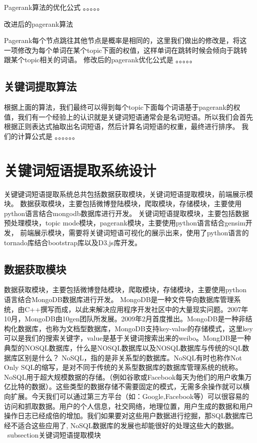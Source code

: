 \documentclass[master]{njuthesis}
\begin{document}
Pagerank算法的优化公式
。。。。。

改进后的pagerank算法

Pagerank每个节点跳往其他节点是概率是相同的，这里我们做出的修改是，将这一项修改为每个单词在某个topic下面的权值，这样单词在跳转时候会倾向于跳转跟某个topic相关的词语。
修改后的pagerank优化公式是
。。。。。

\subsection{关键词提取算法}

根据上面的算法，我们最终可以得到每个topic下面每个词语基于pagerank的权值，我们有一个经验上的认识就是关键词短语通常会是名词短语。所以我们会首先根据正则表达式抽取出名词短语，然后计算名词短语的权重，最终进行排序。
我们的计算公式是
。。。。。。

\section{关键词短语提取系统设计}

    关键键词短语提取系统总共包括数据获取模块，关键词短语提取模块，前端展示模块。
    数据获取模块，主要包括微博登陆模块，爬取模块，存储模块，主要使用python语言结合mongodb数据库进行开发。
    关键词短语提取模块，主要包括数据预处理模块，topic mode模块，pagerank模块，主要使用python语言结合gensim开发，
    前端展示模块，需要将关键词短语可视化的展示出来，使用了python语言的tornado库结合bootstrap库以及D3.js库开发。
    

\subsection{数据获取模块}
   
    数据获取模块，主要包括微博登陆模块，爬取模块，存储模块，主要使用python语言结合MongoDB数据库进行开发。
    MongoDB是一种文件导向数据库管理系统，由C++撰写而成，以此来解决应用程序开发社区中的大量现实问题。2007年10月，MongoDB由10gen团队所发展。2009年2月首度推出。MongoDB是一种非结构化数据库，也称为文档型数据库，MongoDB支持key-value的存储模式，这里key可以是我们的搜索关键字，value是基于关键词搜索出来的weibo。MongDB是一种典型的NOSQL数据库，什么是NOSQL数据库以及NOSQL数据库与传统的SQL数据库区别是什么？
    NoSQL，指的是非关系型的数据库。NoSQL有时也称作Not Only SQL的缩写，是对不同于传统的关系型数据库的数据库管理系统的统称。NoSQL用于超大规模数据的存储。（例如谷歌或Facebook每天为他们的用户收集万亿比特的数据）。这些类型的数据存储不需要固定的模式，无需多余操作就可以横向扩展。今天我们可以通过第三方平台（如：Google,Facebook等）可以很容易的访问和抓取数据。用户的个人信息，社交网络，地理位置，用户生成的数据和用户操作日志已经成倍的增加。我们如果要对这些用户数据进行挖掘，那SQL数据库已经不适合这些应用了, NoSQL数据库的发展也却能很好的处理这些大的数据。
\
subsection{关键词短语提取模块}
    
\end{document}
